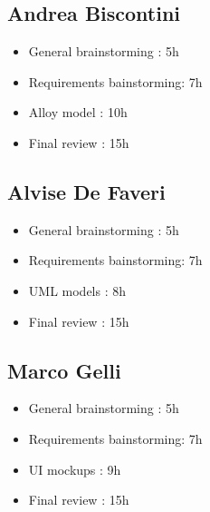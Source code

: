 \subsection{Andrea Biscontini}
\begin{itemize}
	\item General brainstorming : 5h
	\item Requirements bainstorming: 7h
	\item Alloy model : 10h
	\item Final review : 15h
\end{itemize}
\subsection{Alvise De Faveri}
\begin{itemize}
	\item General brainstorming : 5h
	\item Requirements bainstorming: 7h
	\item UML models : 8h
	\item Final review : 15h
\end{itemize}
\subsection{Marco Gelli}
\begin{itemize}
	\item General brainstorming : 5h
	\item Requirements bainstorming: 7h
	\item UI mockups : 9h
	\item Final review : 15h
\end{itemize}